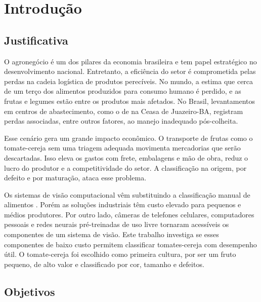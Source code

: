 \chapter{Introdução}\label{cap:introducao}


\section{Justificativa}

O agronegócio é um dos pilares da economia brasileira e tem papel estratégico no desenvolvimento nacional. Entretanto, a eficiência do setor é comprometida pelas perdas na cadeia logística de produtos perecíveis. No mundo, a \textcite{FAO2011} estima que cerca de um terço dos alimentos produzidos para consumo humano é perdido, e as frutas e legumes estão entre os produtos mais afetados. No Brasil, levantamentos em centros de abastecimento, como o de \textcite{ciagro2020} na Ceasa de Juazeiro-BA, registram perdas associadas, entre outros fatores, ao manejo inadequado pós-colheita.

Esse cenário gera um grande impacto econômico. O transporte de frutas como o tomate-cereja sem uma triagem adequada movimenta mercadorias que serão descartadas. Isso eleva os gastos com frete, embalagens e mão de obra, reduz o lucro do produtor e a competitividade do setor. A classificação na origem, por defeito e por maturação, ataca esse problema.

Os sistemas de visão computacional vêm substituindo a classificação manual de alimentos \cite{brosnan2004,cubero2011}. Porém as soluções industriais têm custo elevado para pequenos e médios produtores. Por outro lado, câmeras de telefones celulares, computadores pessoais e redes neurais pré-treinadas de uso livre tornaram acessíveis os componentes de um sistema de visão. Este trabalho investiga se esses componentes de baixo custo permitem classificar tomates-cereja com desempenho útil. O tomate-cereja foi escolhido como primeira cultura, por ser um fruto pequeno, de alto valor e classificado por cor, tamanho e defeitos.

\section{Objetivos}

